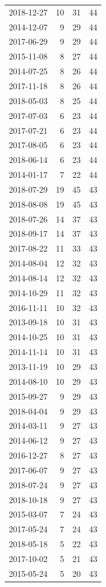 \begin{tabular}{lrrr}
2018-12-27 & 10 & 31 & 44 \\
2014-12-07 & 9 & 29 & 44 \\
2017-06-29 & 9 & 29 & 44 \\
2015-11-08 & 8 & 27 & 44 \\
2014-07-25 & 8 & 26 & 44 \\
2017-11-18 & 8 & 26 & 44 \\
2018-05-03 & 8 & 25 & 44 \\
2017-07-03 & 6 & 23 & 44 \\
2017-07-21 & 6 & 23 & 44 \\
2017-08-05 & 6 & 23 & 44 \\
2018-06-14 & 6 & 23 & 44 \\
2014-01-17 & 7 & 22 & 44 \\
2018-07-29 & 19 & 45 & 43 \\
2018-08-08 & 19 & 45 & 43 \\
2018-07-26 & 14 & 37 & 43 \\
2018-09-17 & 14 & 37 & 43 \\
2017-08-22 & 11 & 33 & 43 \\
2014-08-04 & 12 & 32 & 43 \\
2014-08-14 & 12 & 32 & 43 \\
2014-10-29 & 11 & 32 & 43 \\
2016-11-11 & 10 & 32 & 43 \\
2013-09-18 & 10 & 31 & 43 \\
2014-10-25 & 10 & 31 & 43 \\
2014-11-14 & 10 & 31 & 43 \\
2013-11-19 & 10 & 29 & 43 \\
2014-08-10 & 10 & 29 & 43 \\
2015-09-27 & 9 & 29 & 43 \\
2018-04-04 & 9 & 29 & 43 \\
2014-03-11 & 9 & 27 & 43 \\
2014-06-12 & 9 & 27 & 43 \\
2016-12-27 & 8 & 27 & 43 \\
2017-06-07 & 9 & 27 & 43 \\
2018-07-24 & 9 & 27 & 43 \\
2018-10-18 & 9 & 27 & 43 \\
2015-03-07 & 7 & 24 & 43 \\
2017-05-24 & 7 & 24 & 43 \\
2018-05-18 & 5 & 22 & 43 \\
2017-10-02 & 5 & 21 & 43 \\
2015-05-24 & 5 & 20 & 43 \\

\end{tabular}

